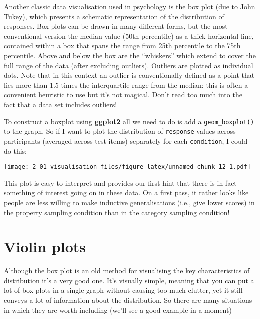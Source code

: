 \documentclass[]{book}
\newenvironment{Shaded}{\begin{snugshade}}{\end{snugshade}}
\newcommand{\DataTypeTok}[1]{\textcolor[rgb]{0.13,0.29,0.53}{#1}}
\newcommand{\KeywordTok}[1]{\textcolor[rgb]{0.13,0.29,0.53}{\textbf{#1}}}
\newcommand{\NormalTok}[1]{#1}
\newcommand{\OperatorTok}[1]{\textcolor[rgb]{0.81,0.36,0.00}{\textbf{#1}}}
\newcommand{\StringTok}[1]{\textcolor[rgb]{0.31,0.60,0.02}{#1}}
\begin{document}
Another classic data visualisation used in psychology is the box plot (due to John Tukey), which presents a schematic representation of the distribution of responses. Box plots can be drawn in many different forms, but the most conventional version the median value (50th percentile) as a thick horizontal line, contained within a box that spans the range from 25th percentile to the 75th percentile. Above and below the box are the ``whiskers'' which extend to cover the full range of the data (after excluding outliers).
Outliers are plotted as individual dots. Note that in this context an outlier is conventionally defined as a point that lies more than 1.5 times the interquartile range from the median: this is often a convenient heuristic to use but it's not magical. Don't read too much into the fact that a data set includes outliers!

To construct a boxplot using \textbf{ggplot2} all we need to do is add a \texttt{geom\_boxplot()} to the graph. So if I want to plot the distribution of \texttt{response} values across participants (averaged across test items) separately for each \texttt{condition}, I could do this:

\begin{Shaded}
\end{Shaded}

\texttt{[image: 2-01-visualisation\_files/figure-latex/unnamed-chunk-12-1.pdf]}

This plot is easy to interpret and provides our first hint that there is in fact something of interest going on in these data. On a first pass, it rather looks like people are less willing to make inductive generalisations (i.e., give lower scores) in the property sampling condition than in the category sampling condition!

\hypertarget{violin-plots}{%
\section{Violin plots}\label{violin-plots}}

Although the box plot is an old method for visualising the key characteristics of distribution it's a very good one. It's visually simple, meaning that you can put a lot of box plots in a single graph without causing too much clutter, yet it still conveys a lot of information about the distribution. So there are many situations in which they are worth including (we'll see a good example in a moment)
\end{document}
